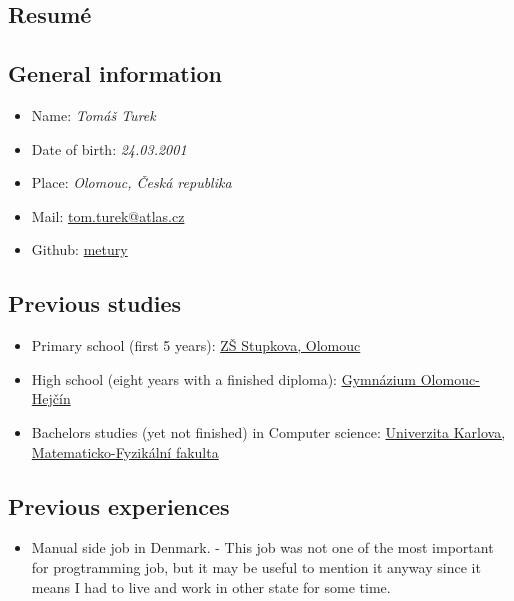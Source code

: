\documentclass{article}
\begin{document}
\begin{center}
\section*{Resumé}
\end{center}

\subsection*{General information}

\begin{itemize}
	\item Name: \textit{Tomáš Turek}
	\item Date of birth: \textit{24.03.2001}
	\item Place: \textit{Olomouc, Česká republika}
	\item Mail: \href{mailto:tom.turek@atlas.cz}{tom.turek@atlas.cz}
	\item Github: \href{https://github.com/metury}{metury}
\end{itemize}

\subsection*{Previous studies}

\begin{itemize}
	\item Primary school (first 5 years): \href{https://zsstupkova.cz/}{ZŠ Stupkova, Olomouc}
	\item High school (eight years with a finished diploma): \href{https://www.gytool.cz/}{Gymnázium Olomouc-Hejčín}
	\item Bachelors studies (yet not finished) in Computer science: \href{https://www.mff.cuni.cz/}{Univerzita Karlova, Matematicko-Fyzikální fakulta}
\end{itemize}

\subsection*{Previous experiences}

\begin{itemize}
	\item Manual side job in Denmark. - This job was not one of the most important for progtramming job, but it may be useful to mention it anyway since it means I had to live and work in other state for some time.
\end{itemize}
\end{document}
